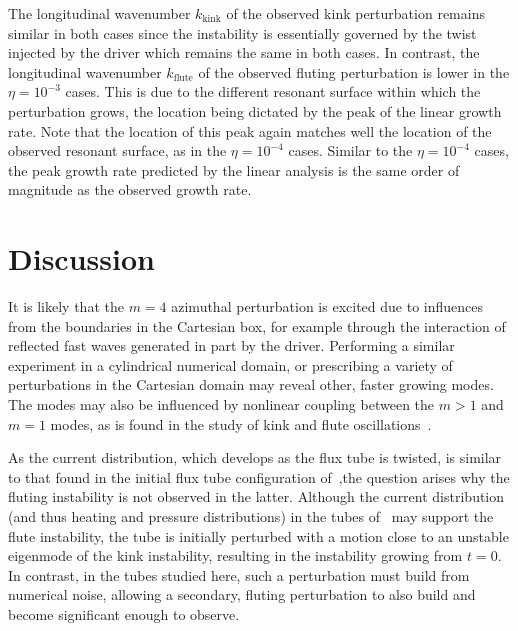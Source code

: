 \documentclass[fleqn,usenatbib]{mnras}
\newcommand{\rs}[2]{{#2}}
\begin{document}
The longitudinal wavenumber $k_{\rs{kink}{\text{kink}}}$ of the observed kink perturbation remains similar in both cases since the instability is essentially governed by the twist injected by the driver which remains the same in both cases. In contrast, the longitudinal wavenumber $k_{\rs{flute}{\text{flute}}}$ of the observed fluting perturbation is lower in the $\eta=10^{-3}$ cases. This is due to the different resonant surface within which the perturbation grows, the location being dictated by the peak of the linear growth rate. Note that the location of this peak again matches well the location of the observed resonant surface, as in the $\eta=10^{-4}$ cases. Similar to the $\eta=10^{-4}$ cases, the peak growth rate predicted by the linear analysis is the same order of magnitude as the observed growth rate.

\section{Discussion}
\label{sec-discussion}

\rs{Due to the perturbations arising from numerical noise, it}{It} is
likely that the $m=4$ \rs{}{azimuthal} perturbation is excited due to
influences from the boundaries in the Cartesian box, for example
through the interaction of reflected fast waves generated in part by
the driver. Performing a similar experiment in a cylindrical numerical
domain, or prescribing a variety of perturbations in the Cartesian
domain may reveal other, faster growing modes. The modes may also be
influenced by nonlinear coupling between the $m>1$ and $m=1$ modes, as
is found in the study of kink and flute
oscillations~\citep{terradasEffectMagneticTwist2018,rudermanNonlinearGenerationFluting2017}. 

As the current distribution, which develops as the flux tube is twisted, is similar to that found in the initial flux tube configuration of~\cite{quinnEffectAnisotropicViscosity2020},the question arises why the fluting instability is not observed in the latter. Although the current distribution (and thus heating and pressure distributions) in the tubes of~\cite{quinnEffectAnisotropicViscosity2020} may support the flute instability, the tube is initially perturbed with a motion close to an unstable eigenmode of the kink instability, resulting in the instability growing from $t=0$. In contrast, in the tubes studied here, such a perturbation must build from numerical noise, allowing a secondary, fluting perturbation to also build and become significant enough to observe.
\end{document}
